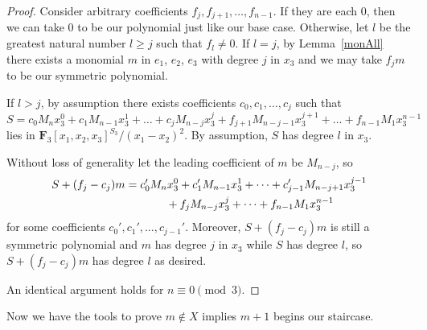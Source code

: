 \documentclass[pdftex]{sigma}
\theoremstyle{definition}
\numberwithin{equation}{section}
\begin{document}
\begin{proof}
 Consider arbitrary coefficients $f_{j}, f_{j+1},\ldots, f_{n-1}$. If they are each $0$, then we can take $0$ to be our polynomial just like our base case. Otherwise, let $l$ be the greatest natural number $l\geq j$ such that $f_l\neq 0$. If $l=j$, by Lemma~\ref{monAll} there exists a monomial $m$ in $e_1$, $e_2$, $e_3$ with degree $j$ in $x_3$ and we may take $f_jm$ to be our symmetric polynomial.

 If $l>j$, by assumption there exists coefficients $c_0,c_1,\dots,c_j$ such that
 \[S=c_0M_nx_3^0+c_1M_{n-1}x_3^1+\dots + c_{j}M_{n-j}x_3^{j}+f_{j+1}M_{n-j-1}x_3^{j+1}+\dots + f_{n-1}M_1x_3^{n-1}\]
 lies in $\mathbf{F}_3[x_1,x_2,x_3]^{S_3}/(x_1-x_2)^2$. By assumption, $S$ has degree $l$ in $x_3$.

 Without loss of generality let the leading coefficient of $m$ be $M_{n-j}$, so
 \begin{gather*}
 S+(f_j-c_j)m=c_0'M_nx_3^0+c_1'M_{n-1}x_3^1+\dots + c_{j-1}'M_{n-j+1}x_3^{j-1}\\
 \hphantom{S+(f_j-c_j)m=}{} +f_{j}M_{n-j}x_3^{j}+\dots + f_{n-1}M_1x_3^{n-1}\
 \end{gather*}
 for some coefficients $c_0',c_1',\ldots, c_{j-1}'$. Moreover, $S+(f_j-c_j)m$ is still a symmetric polynomial and $m$ has degree $j$ in $x_3$ while $S$ has degree $l$, so $S+(f_j-c_j)m$ has degree $l$ as desired.

 An identical argument holds for $n\equiv 0\pmod{3}$.
\end{proof}

Now we have the tools to prove $m\not\in X$ implies $m+1$ begins our staircase.
\end{document}
